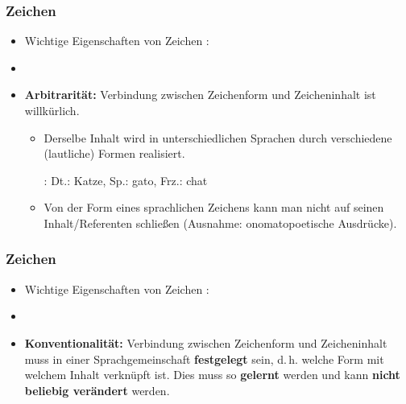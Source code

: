 \begin{frame}
\frametitle{Zeichen}

\begin{itemize}
	\item Wichtige Eigenschaften von Zeichen \citep[vgl.][]{Saussure16a}:
	
	\item[]
		
	\item \textbf{Arbitrarität:} Verbindung zwischen Zeichenform und Zeicheninhalt ist willkürlich.
	
	\begin{itemize}
		\item Derselbe Inhalt wird in unterschiedlichen Sprachen durch verschiedene (lautliche) Formen realisiert.
		
		\ea {}: Dt.: Katze, Sp.: gato, Frz.: chat
		\z 
		
		\item Von der Form eines sprachlichen Zeichens kann man nicht auf seinen Inhalt/Referenten schließen (Ausnahme: onomatopoetische Ausdrücke).
	\end{itemize}
	

	
\end{itemize}

\end{frame}


\begin{frame}
	\frametitle{Zeichen}

\begin{itemize}
	\item Wichtige Eigenschaften von Zeichen \citep[vgl.][]{Saussure16a}:

	\item[]
	
	\item \textbf{Konventionalität:} Verbindung zwischen Zeichenform und Zeicheninhalt muss in einer Sprachgemeinschaft \textbf{festgelegt} sein, d.\,h. welche Form mit welchem Inhalt verknüpft ist. Dies muss so \textbf{gelernt} werden und kann \textbf{nicht beliebig verändert} werden.
\end{itemize}

\end{frame}


